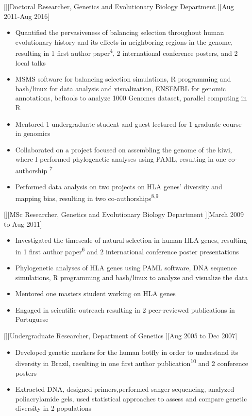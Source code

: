 \documentclass{article}
\begin{document}
[][Doctoral Researcher, Genetics and Evolutionary Biology Department ][Aug 2011-Aug 2016]
\begin{itemize}
    \item Quantified the pervasiveness of balancing selection throughout human evolutionary history and its effects in neighboring regions in the genome, resulting in 1 first author paper\textsuperscript{4}, 2 international conference posters, and 2 local talks
    \item MSMS software for balancing selection simulations, R programming and bash/linux for data analysis and visualization, ENSEMBL for genomic annotations, bcftools to analyze 1000 Genomes dataset, parallel computing in R
    \item Mentored 1 undergraduate student and guest lectured for 1 graduate course in genomics
    \item Collaborated on a project focused on assembling the genome of the kiwi, where I performed phylogenetic analyses using PAML, resulting in one co-authorship \textsuperscript{7} 
    \item Performed data analysis on two projects on HLA genes' diversity and mapping bias, resulting in two co-authorships\textsuperscript{8,9}
\end{itemize}

[][MSc Researcher, Genetics and Evolutionary Biology Department ][March 2009 to Aug 2011]
\begin{itemize}
    \item Investigated the timescale of natural selection in human HLA genes, resulting in 1 first author paper\textsuperscript{6} and 2 international conference poster presentations
    \item Phylogenetic analyses of HLA genes using PAML software, DNA sequence simulations, R programming and bash/linux to analyze and visualize the data
    \item Mentored one masters student working on HLA genes
    \item Engaged in scientific outreach resulting in 2 peer-reviewed publications in Portuguese
\end{itemize}

[][Undergraduate Researcher, Department of Genetics ][Aug 2005 to Dec 2007]
\begin{itemize}
\item Developed genetic markers for the human botfly in order to understand its diversity in Brazil, resulting in one first author publication\textsuperscript{10} and 2 conference posters
\item Extracted DNA, designed primers,performed sanger sequencing, analyzed poliacrylamide gels, used statistical approaches to assess and compare genetic diversity in 2 populations
\end{itemize}
 
\end{document}
